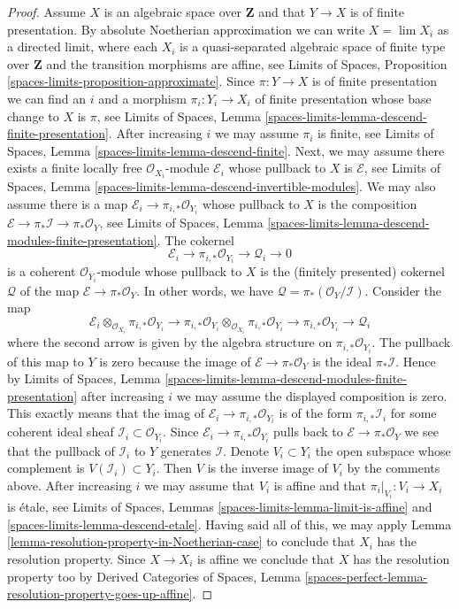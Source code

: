 \begin{proof}
\medskip\noindent
Assume $X$ is an algebraic space over $\mathbf{Z}$ and that
$Y \to X$ is of finite presentation. By absolute Noetherian
approximation we can write $X = \lim X_i$ as a directed limit,
where each $X_i$ is a quasi-separated algebraic space of finite type
over $\mathbf{Z}$ and the transition morphisms are affine, see
Limits of Spaces, Proposition \ref{spaces-limits-proposition-approximate}.
Since $\pi : Y \to X$ is of finite presentation we can find an $i$
and a morphism $\pi_i : Y_i \to X_i$ of finite presentation
whose base change to $X$ is $\pi$, see
Limits of Spaces, Lemma
\ref{spaces-limits-lemma-descend-finite-presentation}.
After increasing $i$ we may assume $\pi_i$ is finite, see
Limits of Spaces, Lemma
\ref{spaces-limits-lemma-descend-finite}.
Next, we may assume there exists a finite locally
free $\mathcal{O}_{X_i}$-module $\mathcal{E}_i$
whose pullback to $X$ is $\mathcal{E}$, see
Limits of Spaces, Lemma \ref{spaces-limits-lemma-descend-invertible-modules}.
We may also assume there is a map
$\mathcal{E}_i \to \pi_{i, *}\mathcal{O}_{Y_i}$
whose pullback to $X$ is the composition
$\mathcal{E} \to \pi_*\mathcal{I} \to \pi_*\mathcal{O}_Y$, see
Limits of Spaces, Lemma
\ref{spaces-limits-lemma-descend-modules-finite-presentation}.
The cokernel
$$
\mathcal{E}_i \to \pi_{i, *}\mathcal{O}_{Y_i} \to \mathcal{Q}_i \to 0
$$
is a coherent $\mathcal{O}_{Y_i}$-module whose pullback to $X$
is the (finitely presented) cokernel $\mathcal{Q}$ of the map
$\mathcal{E} \to \pi_*\mathcal{O}_Y$. In other words, we have
$\mathcal{Q} = \pi_*(\mathcal{O}_Y/\mathcal{I})$. Consider
the map
$$
\mathcal{E}_i
\otimes_{\mathcal{O}_{X_i}}
\pi_{i, *} \mathcal{O}_{Y_i}
\longrightarrow
\pi_{i, *}\mathcal{O}_{Y_i}
\otimes_{\mathcal{O}_{X_i}}
\pi_{i, *} \mathcal{O}_{Y_i}
\to
\pi_{i, *} \mathcal{O}_{Y_i}
\to
\mathcal{Q}_i
$$
where the second arrow is given by the algebra structure
on $\pi_{i, *}\mathcal{O}_{Y_i}$. The pullback of this map
to $Y$ is zero because the image of $\mathcal{E} \to \pi_*\mathcal{O}_Y$
is the ideal $\pi_*\mathcal{I}$. Hence by
Limits of Spaces, Lemma
\ref{spaces-limits-lemma-descend-modules-finite-presentation}
after increasing $i$ we may assume the displayed composition
is zero. This exactly means that the imag of
$\mathcal{E}_i \to \pi_{i, *}\mathcal{O}_{Y_i}$
is of the form $\pi_{i, *}\mathcal{I}_i$
for some coherent ideal sheaf $\mathcal{I}_i \subset \mathcal{O}_{Y_i}$.
Since $\mathcal{E}_i \to \pi_{i, *}\mathcal{O}_{Y_i}$
pulls back to $\mathcal{E} \to \pi_*\mathcal{O}_Y$ we
see that the pullback of $\mathcal{I}_i$ to $Y$ generates $\mathcal{I}$.
Denote $V_i \subset Y_i$ the open subspace whose complement
is $V(\mathcal{I}_i) \subset Y_i$. Then $V$ is the inverse image
of $V_i$ by the comments above. After increasing $i$ we may assume
that $V_i$ is affine and that $\pi_i|_{V_i} : V_i \to X_i$ is 
\'etale, see
Limits of Spaces, Lemmas
\ref{spaces-limits-lemma-limit-is-affine} and
\ref{spaces-limits-lemma-descend-etale}.
Having said all of this, we may apply
Lemma \ref{lemma-resolution-property-in-Noetherian-case}
to conclude that $X_i$ has the
resolution property. Since $X \to X_i$ is affine
we conclude that $X$ has the resolution property too
by Derived Categories of Spaces, Lemma
\ref{spaces-perfect-lemma-resolution-property-goes-up-affine}.
\end{proof}
